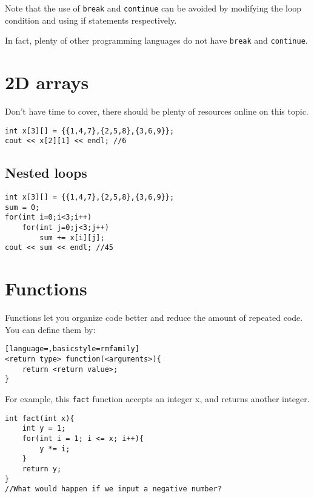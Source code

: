 
Note that the use of \texttt{break} and \texttt{continue} can be avoided by modifying the loop condition and using if statements respectively. 

In fact, plenty of other programming languages do not have \texttt{break} and \texttt{continue}. 

\section{2D arrays}

Don't have time to cover, there should be plenty of resources online on this topic.

\begin{lstlisting}
int x[3][] = {{1,4,7},{2,5,8},{3,6,9}};
cout << x[2][1] << endl; //6
\end{lstlisting}

\subsection{Nested loops}

\begin{lstlisting}
int x[3][] = {{1,4,7},{2,5,8},{3,6,9}};
sum = 0;
for(int i=0;i<3;i++)
    for(int j=0;j<3;j++)
        sum += x[i][j];
cout << sum << endl; //45
\end{lstlisting}

\section{Functions}

Functions let you organize code better and reduce the amount of repeated code. You can define them by:

\begin{lstlisting}[language=,basicstyle=rmfamily]
<return type> function(<arguments>){
    return <return value>;
}
\end{lstlisting}

For example, this \texttt{fact} function accepts an integer x, and returns another integer.

\begin{lstlisting}
int fact(int x){
    int y = 1;
    for(int i = 1; i <= x; i++){
        y *= i;
    }
    return y;
}
//What would happen if we input a negative number?
\end{lstlisting}

